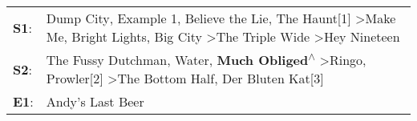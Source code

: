 \begin{supertabular}{p{0.03\textwidth}p{0.92\textwidth}}
 \textbf{S1}:  &  Dump City\textsuperscript{}, \enspace Example 1\textsuperscript{}, \enspace Believe the Lie\textsuperscript{}, \enspace The Haunt[1]\textsuperscript{} \textgreater \enspace Make Me\textsuperscript{}, \enspace Bright Lights, Big City\textsuperscript{} \textgreater \enspace The Triple Wide\textsuperscript{} \textgreater \enspace Hey Nineteen\textsuperscript{}  \enspace  \\
 \textbf{S2}:  &                                              The Fussy Dutchman\textsuperscript{}, \enspace Water\textsuperscript{}, \enspace \textbf{Much Obliged\textsuperscript{$\wedge$}} \textgreater \enspace Ringo\textsuperscript{}, \enspace Prowler[2]\textsuperscript{} \textgreater \enspace The Bottom Half\textsuperscript{}, \enspace Der Bluten Kat[3]\textsuperscript{}  \enspace  \\
 \textbf{E1}:  &                                                                                                                                                                                                                                                                                                                                       Andy's Last Beer\textsuperscript{}  \enspace  \\
\end{supertabular}
